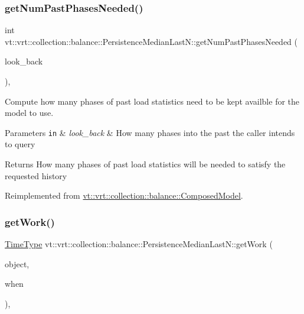 \subsubsection{\texorpdfstring{get\+Num\+Past\+Phases\+Needed()}{getNumPastPhasesNeeded()}}
{\footnotesize\ttfamily int vt\+::vrt\+::collection\+::balance\+::\+Persistence\+Median\+Last\+N\+::get\+Num\+Past\+Phases\+Needed (\begin{DoxyParamCaption}\item[{int}]{look\+\_\+back }\end{DoxyParamCaption})\hspace{0.3cm}{\ttfamily [override]}, {\ttfamily [virtual]}}



Compute how many phases of past load statistics need to be kept availble for the model to use. 


\begin{DoxyParams}[1]{Parameters}
\mbox{\tt in}  & {\em look\+\_\+back} & How many phases into the past the caller intends to query\\
\hline
\end{DoxyParams}
\begin{DoxyReturn}{Returns}
How many phases of past load statistics will be needed to satisfy the requested history 
\end{DoxyReturn}


Reimplemented from \hyperlink{classvt_1_1vrt_1_1collection_1_1balance_1_1_composed_model_a1fb8c98e3500be582095a54369661316}{vt\+::vrt\+::collection\+::balance\+::\+Composed\+Model}.

\mbox{\label{structvt_1_1vrt_1_1collection_1_1balance_1_1_persistence_median_last_n_ac8ce962b50e41326109cc2f87fa19cf0}} 
\subsubsection{\texorpdfstring{get\+Work()}{getWork()}}
{\footnotesize\ttfamily \hyperlink{namespacevt_a876a9d0cd5a952859c72de8a46881442}{Time\+Type} vt\+::vrt\+::collection\+::balance\+::\+Persistence\+Median\+Last\+N\+::get\+Work (\begin{DoxyParamCaption}\item[{\hyperlink{namespacevt_1_1vrt_1_1collection_1_1balance_a14c8d2c972f2913aa3f1636e5be0a120}{Element\+I\+D\+Type}}]{object,  }\item[{\hyperlink{structvt_1_1vrt_1_1collection_1_1balance_1_1_phase_offset}{Phase\+Offset}}]{when }\end{DoxyParamCaption})\hspace{0.3cm}{\ttfamily [override]}, {\ttfamily [virtual]}}



